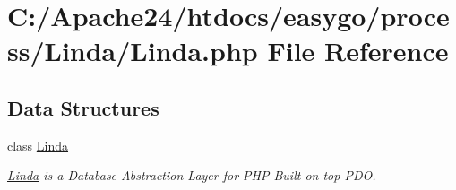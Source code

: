 \hypertarget{_linda_8php}{}\section{C\+:/\+Apache24/htdocs/easygo/process/\+Linda/\+Linda.php File Reference}
\label{_linda_8php}
\subsection*{Data Structures}
\begin{DoxyCompactItemize}
\item 
class \hyperlink{class_linda}{Linda}
\begin{DoxyCompactList}\small\item\em \hyperlink{class_linda}{Linda} is a Database Abstraction Layer for P\+H\+P Built on top P\+D\+O. \end{DoxyCompactList}\end{DoxyCompactItemize}
